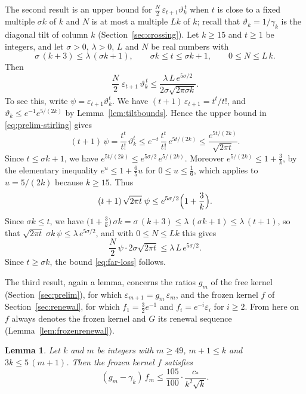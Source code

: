 \documentclass{amsart}
\newtheorem{lemma}[theorem]{Lemma}
\theoremstyle{definition}
\theoremstyle{remark}
\numberwithin{equation}{section}
\begin{document}
The second result is an upper bound for $\frac N2\,\varepsilon_{t+1}\vartheta_k^{\,t}$ when $t$ is close to a fixed multiple $\sigma k$ of $k$ and $N$ is at most a multiple $Lk$ of $k$; recall that $\vartheta_k=1/\gamma_k$ is the diagonal tilt of column $k$ (Section~\ref{sec:crossing}). Let $k\ge 15$ and $t\ge 1$ be integers, and let $\sigma>0$, $\lambda>0$, $L$ and $N$ be real numbers with
\[
\sigma\,(k+3)\le\lambda\,(\sigma k+1),\qquad\sigma k\le t\le\sigma k+1,\qquad 0\le N\le L\,k .
\]
Then
\begin{equation}\label{eq:far-loss}
\frac N2\;\varepsilon_{t+1}\,\vartheta_k^{\,t}\le\frac{\lambda\,L\,e^{5\sigma/2}}{2\sigma\sqrt{2\pi\sigma k}} .
\end{equation}
To see this, write $\psi=\varepsilon_{t+1}\vartheta_k^{t}$. We have $(t+1)\,\varepsilon_{t+1}=t^t/t!$, and $\vartheta_k\le e^{-1}e^{5/(2k)}$ by Lemma~\ref{lem:tiltbounds}. Hence the upper bound in \eqref{eq:prelim-stirling} gives
\[
(t+1)\,\psi=\frac{t^t}{t!}\,\vartheta_k^{t}\le e^{-t}\,\frac{t^t}{t!}\,e^{5t/(2k)}\le\frac{e^{5t/(2k)}}{\sqrt{2\pi t}}.
\]
Since $t\le\sigma k+1$, we have $e^{5t/(2k)}\le e^{5\sigma/2}\,e^{5/(2k)}$. Moreover $e^{5/(2k)}\le 1+\frac3k$, by the elementary inequality $e^{u}\le 1+\frac65u$ for $0\le u\le\frac16$, which applies to $u=5/(2k)$ because $k\ge 15$. Thus
\[
(t+1)\,\sqrt{2\pi t}\;\psi\le e^{5\sigma/2}\Bigl(1+\frac3k\Bigr).
\]
Since $\sigma k\le t$, we have $\bigl(1+\frac3k\bigr)\,\sigma k=\sigma\,(k+3)\le\lambda\,(\sigma k+1)\le\lambda\,(t+1)$, so that $\sqrt{2\pi t}\;\sigma k\,\psi\le\lambda\,e^{5\sigma/2}$, and with $0\le N\le Lk$ this gives
\[
\frac N2\,\psi\cdot 2\sigma\sqrt{2\pi t}\le\lambda\,L\,e^{5\sigma/2}.
\]
Since $t\ge\sigma k$, the bound \eqref{eq:far-loss} follows.

The third result, again a lemma, concerns the ratios $g_m$ of the free kernel (Section~\ref{sec:prelim}), for which $\varepsilon_{m+1}=g_m\,\varepsilon_m$, and the frozen kernel $f$ of Section~\ref{sec:renewal}, for which $f_1=\frac32e^{-1}$ and $f_i=e^{-i}\varepsilon_i$ for $i\ge 2$. From here on $f$ always denotes the frozen kernel and $G$ its renewal sequence (Lemma~\ref{lem:frozenrenewal}).

\begin{lemma}\label{lem:farweights}
Let $k$ and $m$ be integers with $m\ge 49$, $m+1\le k$ and $3k\le 5\,(m+1)$. Then the frozen kernel $f$ satisfies
\[
(g_m-\gamma_k)\,f_m\le\frac{105}{100}\cdot\frac{c_\ast}{k^2\sqrt k} .
\]
\end{lemma}
\end{document}
